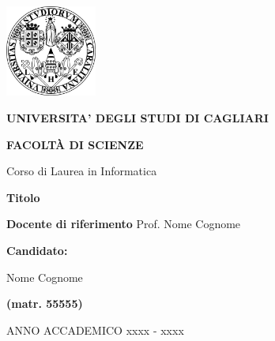 \begin{titlepage}
    \begin{center}
        \vspace*{1cm}
        
        \includegraphics[width=3cm]{Logo_UNICA.png}
        
        \vspace{0.5cm}
        \Large
        \textbf{UNIVERSITA' DEGLI STUDI DI CAGLIARI}
        
        \vspace{0.5cm}
        \normalsize
        \textbf{FACOLTÀ DI SCIENZE}
        
        \vspace{0.5cm}
        Corso di Laurea in Informatica
        
        \vspace{4cm}
        
        \LARGE
        \textbf{Titolo}
        
        \vspace{2cm}
        
        
		    \begin{multicols}{2}
		    \normalsize
		    \textbf{Docente di riferimento}
		    \newline
		    Prof. Nome Cognome
		    \newline
		   

		    \textbf{Candidato:}
		    
		    Nome Cognome
		    
		    \textbf{(matr. 55555)}
		    \end{multicols}
        
        \vspace{4cm}
        
        \normalsize
        ANNO ACCADEMICO xxxx - xxxx
        
    \end{center}
\end{titlepage}
